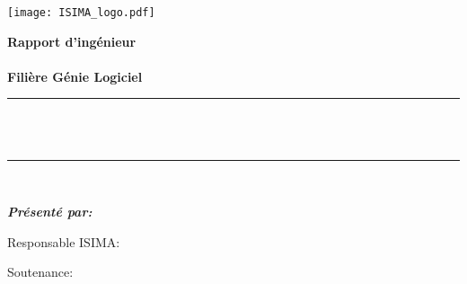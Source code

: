 \makeatletter
\begin{titlepage}
  \newcommand{\HRule}{\rule{\linewidth}{0.5mm}}
  \center
  \texttt{[image: ISIMA\_logo.pdf]}
  \vspace{.5cm}



  {\bfseries\Large Rapport d'ingénieur\\[.3cm]
  \sujetLong \\[.5cm]
  \large Filière Génie Logiciel\\[1cm]}
  \HRule \\[0.3cm]
  { \LARGE \bfseries \@title}\\ %
  \HRule \\[1.5cm]

  \begin{flushleft} \Large \bfseries
    \emph{Présenté par:} \@author\\[1cm]
  \end{flushleft}
  \begin{minipage}[t]{0.52\textwidth}
    \begin{flushleft} \large
      Responsable ISIMA: %
    \end{flushleft}
  \end{minipage}
  \hfill
  \begin{minipage}[t]{0.42\textwidth}
    \begin{flushleft} \large
      Soutenance: \@date\\[.5cm]

    \end{flushleft}
  \end{minipage}\\[1.5cm]


\end{titlepage}
